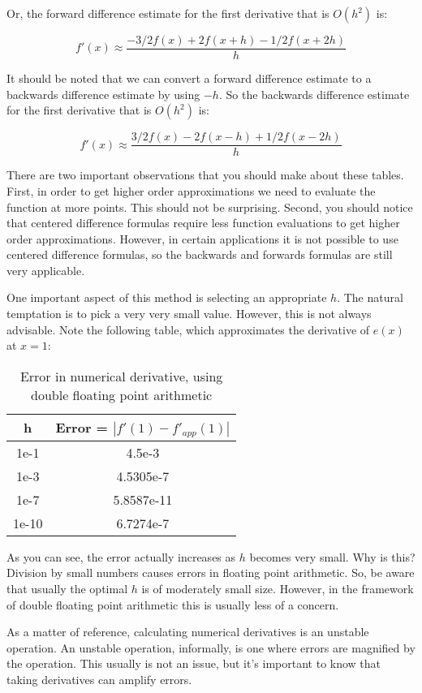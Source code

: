 Or, the forward difference estimate for the first derivative that is $O(h^2)$ is:

\[
f'(x) \approx \frac{-3/2f(x) + 2f(x+h) - 1/2 f(x+2h)}{h}
\]

It should be noted that we can convert a forward difference estimate to a backwards difference estimate by using $-h$. So the backwards difference estimate for the first derivative that is $O(h^2)$ is:

\[
f'(x) \approx \frac{3/2f(x) - 2f(x-h) + 1/2 f(x-2h)}{h}
\]

There are two important observations that you should make about these tables. First, in order to get higher order approximations we need to evaluate the function at more points. This should not be surprising. Second, you should notice that centered difference formulas require less function evaluations to get higher order approximations. However, in certain applications it is not possible to use centered difference formulas, so the backwards and forwards formulas are still very applicable.

One important aspect of this method is selecting an appropriate $h$. The natural temptation is to pick a very very small value. However, this is not always advisable. Note the following table, which approximates the derivative of $e(x)$ at $x = 1$:

\begin{table}[h!]
\begin{center}
\begin{tabular}{|cc|}
\hline
h & Error  = $|f'(1)-f'_{app}(1)|$ \\ \hline
1e-1 & 4.5e-3 \\
1e-3 & 4.5305e-7 \\
1e-7 & 5.8587e-11 \\
1e-10 & 6.7274e-7 \\ \hline
\end{tabular}
\caption{Error in numerical derivative, using double floating point arithmetic}
\end{center}
\end{table}

As you can see, the error actually increases as $h$ becomes very small. Why is this? Division by small numbers causes errors in floating point arithmetic. So, be aware that usually the optimal $h$ is of moderately small size. However, in the framework of double floating point arithmetic this is usually less of a concern.

As a matter of reference, calculating numerical derivatives is an unstable operation. An unstable operation, informally, is one where errors are magnified by the operation. This usually is not an issue, but it's important to know that taking derivatives can amplify errors.

